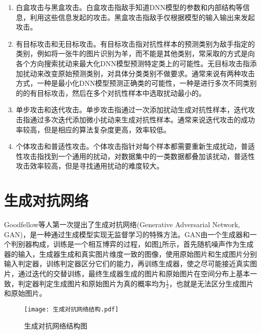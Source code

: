 \begin{enumerate}
	\renewcommand{\labelenumi}{\theenumi)}
	\item 白盒攻击与黑盒攻击。白盒攻击指敌手知道DNN模型的参数和内部结构等信息，利用这些信息发起的攻击。黑盒攻击指敌手仅根据模型的输入输出来发起攻击。
	\item 有目标攻击和无目标攻击。有目标攻击指对抗性样本的预测类别为敌手指定的类别，例如将一张牛的图片识别为羊，而不能是其他类别，常采取的方式是向各个方向搜索扰动来最大化DNN模型预测特定类上的可能性。无目标攻击指添加扰动来改变原始预测类别，对具体分类类别不做要求。通常来说有两种攻击方式，一种是最小化DNN模型预测正确类的可能性，一种是进行多次不同类别的的有目标攻击，然后在多个对抗性样本中选取扰动最小的。
	\item 单步攻击和迭代攻击。单步攻击指通过一次添加扰动生成对抗性样本，迭代攻击指通过多次迭代添加微小扰动来生成对抗性样本。通常来说迭代攻击的成功率较高，但是相应的算法复杂度更高，效率较低。
	\item 个体攻击和普适性攻击。个体攻击指针对每个样本都需要重新生成扰动，普适性攻击指找到一个通用的扰动，对数据集中的一类数据都叠加该扰动，普适性攻击效率较高，但是寻找通用扰动的难度较大。
\end{enumerate}

\section{生成对抗网络}

Goodfellow等人\cite{goodfellow2014generative}第一次提出了生成对抗网络(Generative Adversarial Network, GAN)，是一种通过生成模型实现无监督学习的特殊方法。GAN由一个生成器和一个判别器构成，训练是一个相互博弈的过程，如图\ref{生成对抗网络结构图}所示，首先随机噪声作为生成器的输入，生成器生成和真实图片维度一致的图像，使用原始图片和生成图片分别输入判定器，训练判定器区分它们的能力，再训练生成器，使之尽可能接近真实图片，通过迭代的交替训练，最终生成器生成的图片和原始图片在空间分布上基本一致，判定器判定生成图片和原始图片为真的概率均为$\frac{1}{2}$，也就是无法区分生成图片和原始图片。

\begin{figure}[htbp]%
	\centering
	\texttt{[image: 生成对抗网络结构.pdf]}
	\setlength{\abovecaptionskip}{5mm} %
	\caption{生成对抗网络结构图}
	\label{生成对抗网络结构图}
\end {figure}


